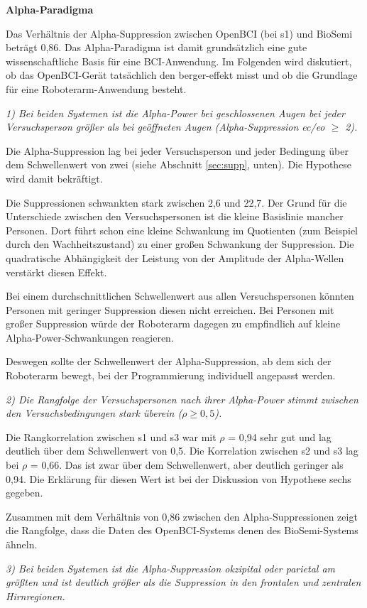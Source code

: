 \textbf{Alpha-Paradigma}

Das Verhältnis der Alpha-Suppression zwischen OpenBCI (bei s1) und BioSemi beträgt 0,86. Das Alpha-Paradigma ist damit grundsätzlich eine gute wissenschaftliche Basis für eine BCI-Anwendung. Im Folgenden wird diskutiert, ob das OpenBCI-Gerät tatsächlich den \gls{berger-effekt} misst und ob die Grundlage für eine Roboterarm-Anwendung besteht.

\textit{1) Bei beiden Systemen ist die Alpha-Power bei geschlossenen Augen bei jeder Versuchsperson größer als bei geöffneten Augen (Alpha-Suppression \acrshort{ec}/\acrshort{eo} $\geq$ 2).}

Die Alpha-Suppression lag bei jeder Versuchsperson und jeder Bedingung über dem Schwellenwert von zwei (siehe Abschnitt \ref{sec:supp}, unten). Die Hypothese wird damit bekräftigt.

Die Suppressionen schwankten stark zwischen 2,6 und 22,7. Der Grund für die Unterschiede zwischen den Versuchspersonen ist die kleine Basislinie mancher Personen. Dort führt schon eine kleine Schwankung im Quotienten (zum Beispiel durch den Wachheitszustand) zu einer großen Schwankung der Suppression. Die quadratische Abhängigkeit der Leistung von der Amplitude der Alpha-Wellen verstärkt diesen Effekt.

Bei einem durchschnittlichen Schwellenwert aus allen Versuchspersonen könnten Personen mit geringer Suppression diesen nicht erreichen. Bei Personen mit großer Suppression würde der Roboterarm dagegen zu empfindlich auf kleine Alpha-Power-Schwankungen reagieren.

Deswegen sollte der Schwellenwert der Alpha-Suppression, ab dem sich der Roboterarm bewegt, bei der Programmierung individuell angepasst werden.

\textit{2) Die Rangfolge der Versuchspersonen nach ihrer Alpha-Power stimmt zwischen den Versuchsbedingungen stark überein ($\rho \geq 0{,}5$).}

Die Rangkorrelation zwischen s1 und s3 war mit $\rho$ = 0,94 sehr gut und lag deutlich über dem Schwellenwert von 0,5. Die Korrelation zwischen s2 und s3 lag bei $\rho$ = 0,66. Das ist zwar über dem Schwellenwert, aber deutlich geringer als 0,94. Die Erklärung für diesen Wert ist bei der Diskussion von Hypothese sechs gegeben.

Zusammen mit dem Verhältnis von 0,86 zwischen den Alpha-Suppressionen zeigt die Rangfolge, dass die Daten des OpenBCI-Systems denen des BioSemi-Systems ähneln.

\textit{3) Bei beiden Systemen ist die Alpha-Suppression okzipital oder parietal am größten und ist deutlich größer als die Suppression in den frontalen und zentralen Hirnregionen.}

